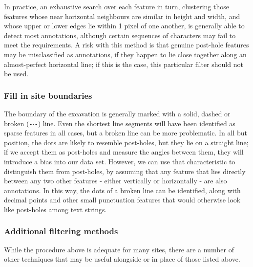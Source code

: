\documentclass[../../ArchStats.tex]{subfiles}
\begin{document}
In practice, an exhaustive search over each feature in turn, clustering those features whose near horizontal neighbours are similar in height and width, and whose upper or lower edges lie within 1 pixel of one another, is generally able to detect most annotations, although certain sequences of characters may fail to meet the requirements. A risk with this method is that genuine post-hole features may be misclassified as annotations, if they happen to lie close together along an almost-perfect horizontal line; if this is the case, this particular filter should not be used. 


\subsubsection{Fill in site boundaries}

The boundary of the excavation is generally marked with a solid, dashed or broken (\texttt{-$\cdot$-}) line. Even the shortest line segments will have been identified as sparse features in all cases, but a broken line can be more problematic. In all but position, the dots are likely to resemble post-holes, but they lie on a straight line; if we accept them as post-holes and measure the angles between them, they will introduce a bias into our data set. However, we can use that characteristic to distinguish them from post-holes, by assuming that any feature that lies directly between any two other features - either vertically or horizontally - are also annotations. In this way, the dots of a broken line can be identified, along with decimal points and other small punctuation features that would otherwise look like post-holes among text strings.

\subsubsection{Additional filtering methods}
\label{sec:alternative-techniques}


While the procedure above is adequate for many sites, there are a number of other techniques that may be useful alongside or in place of those listed above. 
\end{document}
